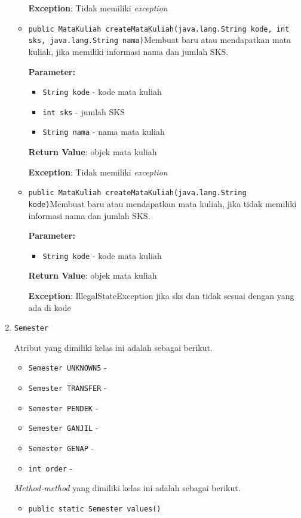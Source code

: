 \documentclass{article}
\begin{document}
\begin{enumerate}
\begin{itemize}
\textbf{Exception}: Tidak memiliki \textit{exception}

\item \texttt{public MataKuliah createMataKuliah(java.lang.String kode, int sks, java.lang.String nama)}Membuat baru atau mendapatkan mata kuliah, jika memiliki informasi
 nama dan jumlah SKS.

\textbf{Parameter:}
\begin{itemize}
\item \texttt{String kode} - 
kode mata kuliah
\item \texttt{int sks} - 
jumlah SKS
\item \texttt{String nama} - 
nama mata kuliah
\end{itemize}
\textbf{Return Value}: objek mata kuliah

\textbf{Exception}: Tidak memiliki \textit{exception}

\item \texttt{public MataKuliah createMataKuliah(java.lang.String kode)}Membuat baru atau mendapatkan mata kuliah, jika tidak memiliki informasi
 nama dan jumlah SKS.

\textbf{Parameter:}
\begin{itemize}
\item \texttt{String kode} - 
kode mata kuliah
\end{itemize}
\textbf{Return Value}: objek mata kuliah

\textbf{Exception}: IllegalStateException
             jika sks dan tidak sesuai dengan yang ada di kode

\end{itemize}
\item \texttt{Semester}



Atribut yang dimiliki kelas ini adalah sebagai berikut.
\begin{itemize}
\item \texttt{Semester UNKNOWN5} - 
\item \texttt{Semester TRANSFER} - 
\item \texttt{Semester PENDEK} - 
\item \texttt{Semester GANJIL} - 
\item \texttt{Semester GENAP} - 
\item \texttt{int order} - 
\end{itemize}
\textit{Method-method} yang dimiliki kelas ini adalah sebagai berikut.
\begin{itemize}
\item \texttt{public static Semester values()}


\end{itemize}
\end{enumerate}
\end{document}
